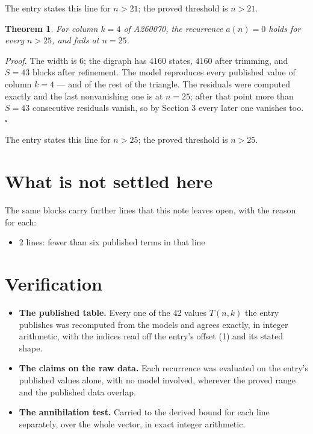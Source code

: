 \documentclass[11pt]{article}
\newtheorem{theorem}{Theorem}
\theoremstyle{definition}
\begin{document}
The entry states this line for $n > 21$; the proved threshold is $n > 21$.

\begin{theorem} For column $k = 4$ of A260070, the recurrence $a(n) = 0$ holds for every $n > 25$, and fails at $n = 25$.\end{theorem}

{\itshape Proof.} The width is $6$; the digraph has $4160$ states, $4160$ after trimming, and $S = 43$ blocks after refinement. The model reproduces every published value of column $k = 4$ --- and of the rest of the triangle. The residuals were computed exactly and the last nonvanishing one is at $n = 25$; after that point more than $S = 43$ consecutive residuals vanish, so by Section 3 every later one vanishes too. $\square$

The entry states this line for $n > 25$; the proved threshold is $n > 25$.

\section{What is not settled here}

The same blocks carry further lines that this note leaves open, with the reason for each:

\begin{itemize}

\item 2 lines: fewer than six published terms in that line

\end{itemize}

\section{Verification}

\begin{itemize}

\item {\bfseries The published table.} Every one of the 42 values $T(n,k)$ the entry publishes was recomputed from the models and agrees exactly, in integer arithmetic, with the indices read off the entry's offset (1) and its stated shape.

\item {\bfseries The claims on the raw data.} Each recurrence was evaluated on the entry's published values alone, with no model involved, wherever the proved range and the published data overlap.

\item {\bfseries The annihilation test.} Carried to the derived bound for each line separately, over the whole vector, in exact integer arithmetic.

\end{itemize}
\end{document}
